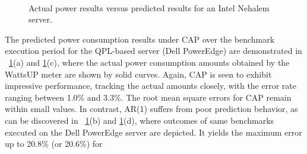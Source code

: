 \begin{figure}[]
  \centering
  \\
  \caption{Actual power results versus predicted results for an Intel
    Nehalem server.}
  \label{fig:compareintel}
\end{figure}
The predicted power consumption results under CAP over the benchmark
execution period for the QPL-based server (Dell PowerEdge) are
demonstrated in \figurenames~\ref{fig:compareintel}(a) and
\ref{fig:compareintel}(c), where the actual power consumption amounts
obtained by the WattsUP meter are shown by solid curves.  Again, CAP is
seen to exhibit impressive performance, tracking the actual amounts
closely, with the error rate ranging between 1.0\% and 3.3\%.  The root
mean square errors for CAP remain within small values.  In contrast,
AR(1) suffers from poor prediction behavior, as can be discovered in
\figurenames~\ref{fig:compareintel}(b) and \ref{fig:compareintel}(d),
where outcomes of same benchmarks executed on the Dell PowerEdge server
are depicted.  It yields the maximum error up to 20.8\% (or 20.6\%) for
